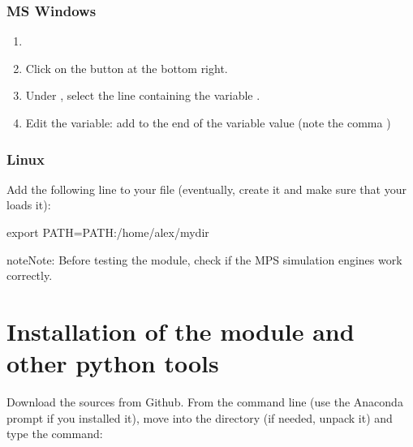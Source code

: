 \documentclass[letterpaper,10pt,english]{sphinxmanual}
\begin{document}
\subsubsection{MS Windows}
\label{\detokenize{installation:id1}}\begin{enumerate}
%
\item {} 

\item {} 
Click on the button  at the bottom right.

\item {} 
Under , select the line containing the variable .

\item {} 
Edit the variable: add to the end of the variable value  
(note the comma \sphinxstylestrong{;})

\end{enumerate}


\subsubsection{Linux}
\label{\detokenize{installation:id2}}
Add the following line to your  file (eventually, create it and make
sure that your  loads it):

\begin{sphinxVerbatim}[commandchars=\\\{\}]
export PATH=\PYGZdl{}\PYGZob{}PATH\PYGZcb{}:/home/alex/my\PYGZus{}dir
\end{sphinxVerbatim}

\begin{sphinxadmonition}{note}{Note:}
Before testing the  module, check if the MPS simulation
engines work correctly.
\end{sphinxadmonition}


\section{Installation of the module  and other python tools}
\label{\detokenize{installation:installation-of-the-module-s2dcd-and-other-python-tools}}
Download the sources from Github. From the command line (use the Anaconda prompt if you installed it), move into the directory
 (if needed, unpack it)  and type the command:
\end{document}
